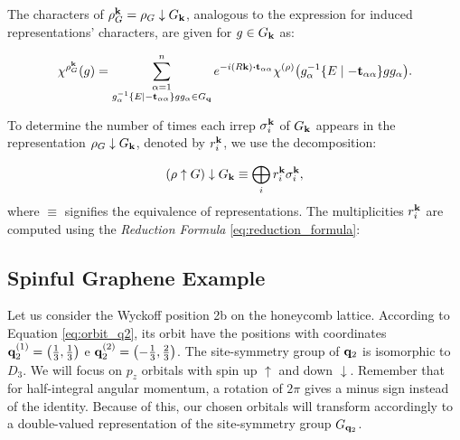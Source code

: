 The characters of \(\rho_G^{\vb{k}} = \rho_G \downarrow G_{\vb{k}}\), analogous to the expression for induced representations' characters, are given for \(g \in G_{\vb{k}}\) as:

\begin{equation} \label{eq:}
\chi^{\rho_G^\k}(g) =
\sum_{\substack{\alpha=1 \\ g_\alpha^{-1}\sg{E}{-\t_{\alpha\alpha}}g g_\alpha \in G_\q}}^n e^{-i(R\k)\vdot\t_{\alpha\alpha}}
\chi^{(\rho)}\qty(g_\alpha^{-1}\sg{E}{-\t_{\alpha\alpha}}g g_\alpha).
\end{equation}

To determine the number of times each irrep \(\sigma_i^{\vb{k}}\) of \(G_{\vb{k}}\) appears in the representation \(\rho_G \downarrow G_{\vb{k}}\), denoted by \(r_i^{\vb{k}}\), we use the decomposition:

\begin{equation} \label{eq:induce_subduce}
(\rho \uparrow G) \downarrow G_{\vb{k}} \equiv \bigoplus_i r_i^{\vb{k}} \sigma_i^{\vb{k}},
\end{equation}
where \(\equiv\) signifies the equivalence of representations. The multiplicities \(r_i^{\vb{k}}\) are computed using the \textit{Reduction Formula} \ref{eq:reduction_formula}:

\subsection{Spinful Graphene Example} \label{subsec:spinful_graphene}

Let us consider the Wyckoff position 2b on the honeycomb lattice. According to Equation \ref{eq:orbit_q2}, its orbit have the positions with coordinates ${\vb{q}}_2^{(1)} = \qty(\frac{1}{3}, \frac{1}{3})$ e ${\vb{q}}_2^{(2)} = \qty(-\frac{1}{3}, \frac{2}{3})$. The site-symmetry group of ${\vb{q}}_2$ is isomorphic to $D_3$. We will focus on $p_z$ orbitals with spin up $\uparrow$ and down $\downarrow$. Remember that for half-integral angular momentum, a rotation of $2\pi$ gives a minus sign instead of the identity. Because of this, our chosen orbitals will transform accordingly to a double-valued representation of the site-symmetry group $G_{{\vb{q}}_2}$.

